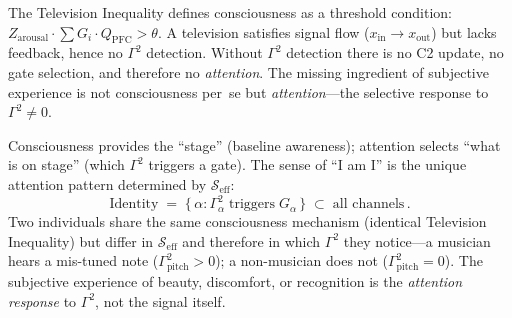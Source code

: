 \documentclass[aps,pre,twocolumn,superscriptaddress,floatfix]{revtex4-2}
\begin{document}
\begin{remark}[Subjective experience $=$ consciousness
  $\times$ attention]
\label{rem:qualia}
The Television Inequality defines consciousness as a
threshold condition: $Z_{\text{arousal}} \cdot \sum G_i
\cdot Q_{\text{PFC}} > \theta$.
A television satisfies signal flow ($x_{\text{in}} \to
x_{\text{out}}$) but lacks feedback, hence no $\Gamma^2$
detection.
Without $\Gamma^2$ detection there is no C2 update,
no gate selection, and therefore no \emph{attention}.
The missing ingredient of subjective experience is not
consciousness per~se but \emph{attention}---the
selective response to $\Gamma^2 \neq 0$.

Consciousness provides the ``stage'' (baseline
awareness); attention selects ``what is on stage''
(which $\Gamma^2$ triggers a gate).
The sense of ``I am I'' is the unique attention pattern
determined by $\mathcal{S}_{\text{eff}}$:
\[
  \text{Identity} \;=\;
  \bigl\{\,\alpha : \Gamma^2_\alpha
  \;\text{triggers}\; G_\alpha\,\bigr\}
  \;\subset\;
  \text{all channels}\,.
\]
Two individuals share the same consciousness mechanism
(identical Television Inequality) but differ in
$\mathcal{S}_{\text{eff}}$ and therefore in which
$\Gamma^2$ they notice---a musician hears a mis-tuned
note ($\Gamma^2_{\text{pitch}} > 0$); a non-musician
does not ($\Gamma^2_{\text{pitch}} = 0$).
The subjective experience of beauty, discomfort, or
recognition is the \emph{attention response} to
$\Gamma^2$, not the signal itself.
\end{remark}
\end{document}
